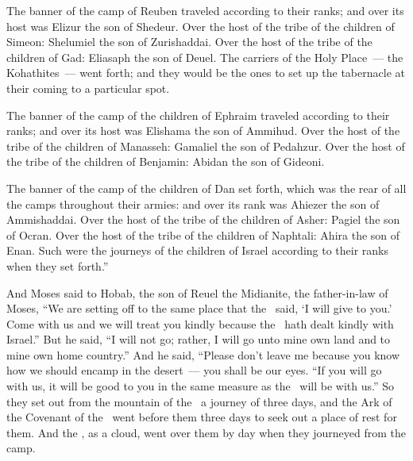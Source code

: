 \begin{inparaenum}
   The banner of the camp of Reuben traveled according to their ranks; and over its host was Elizur the son of Shedeur.%
   Over the host of the tribe of the children of Simeon: Shelumiel the son of Zurishaddai.%
   Over the host of the tribe of the children of Gad: Eliasaph the son of Deuel.%
   The carriers of the Holy Place~--- the Kohathites~--- went forth; and they would be the ones to set up the tabernacle at their coming to a particular spot.%
  
   The banner of the camp of the children of Ephraim traveled according to their ranks; and over its host was Elishama the son of Ammihud.%
   Over the host of the tribe of the children of Manasseh: Gamaliel the son of Pedahzur.%
   Over the host of the tribe of the children of Benjamin: Abidan the son of Gideoni.%
  
   The banner of the camp of the children of Dan set forth, which was the rear of all the camps throughout their armies: and over its rank was Ahiezer the son of Ammishaddai.%
   Over the host of the tribe of the children of Asher: Pagiel the son of Ocran.%
   Over the host of the tribe of the children of Naphtali: Ahira the son of Enan.%
   Such were the journeys of the children of Israel according to their ranks when they set forth.''%
  
   And Moses said to Hobab, the son of Reuel the Midianite, the father-in-law of Moses, ``We are setting off to the same place that the \lord\ said, `I will give to you.' Come with us and we will treat you kindly because the \lord\ hath dealt kindly with Israel.''%
   But he said, ``I will not go; rather, I will go unto mine own land and to mine own home country.''%
   And he said, ``Please don't leave me because you know how we should encamp in the desert~--- you shall be our eyes.%
   ``If you will go with us, it will be good to you in the same measure as the \lord\ will be with us.''%
   So they set out from the mountain of the \lord\ a journey of three days, and the Ark of the Covenant of the \lord\ went before them three days to seek out a place of rest for them.%
   And the \lord, as a cloud, went over them by day when they journeyed from the camp.%
  

\end{inparaenum}
